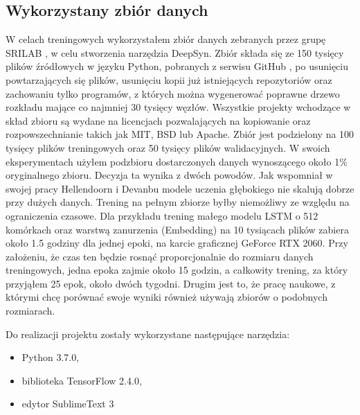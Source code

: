 \subsection {Wykorzystany zbiór danych}
\label{sec:dataset-background}
W celach treningowych wykorzystałem zbiór danych zebranych przez grupę SRILAB \cite{dataset}, w celu stworzenia narzędzia 
DeepSyn. Zbiór składa się ze 150 tysięcy plików źródłowych w języku Python, pobranych z serwisu GitHub \cite{github}, po 
usunięciu powtarzających się plików, usunięciu kopii już istniejących repozytoriów oraz zachowaniu tylko programów, z których
można wygenerować poprawne drzewo rozkładu mające co najmniej 30 tysięcy węzłów. Wszystkie projekty wchodzące w skład 
zbioru są wydane na licencjach pozwalających na kopiowanie oraz rozpowszechnianie takich jak MIT, BSD lub Apache. Zbiór jest 
podzielony na 100 tysięcy plików treningowych oraz 50 tysięcy plików walidacyjnych. W swoich eksperymentach użyłem podzbioru 
dostarczonych danych wynoszącego około 1\% oryginalnego zbioru. Decyzja ta wynika z dwóch powodów. Jak wspomniał w swojej 
pracy Hellendoorn i Devanbu\cite{hellendoorn} modele uczenia głębokiego nie skalują dobrze przy dużych danych. Trening na 
pełnym zbiorze byłby niemożliwy ze względu na ograniczenia czasowe. Dla przykładu trening małego modelu LSTM o 512 komórkach 
oraz warstwą zanurzenia (Embedding) na 10 tysiącach plików zabiera około 1.5 godziny dla jednej epoki, na karcie graficznej GeForce RTX 2060. 
Przy założeniu, że czas ten będzie rosnąć proporcjonalnie do rozmiaru danych treningowych, jedna epoka zajmie 
około 15 godzin, a całkowity trening, za który przyjąłem 25 epok, około dwóch tygodni. Drugim jest to, że pracę naukowe, z 
którymi chcę porównać swoje wyniki również używają zbiorów o podobnych rozmiarach. 

Do realizacji projektu zostały wykorzystane następujące narzędzia:
\begin{itemize}
    \item Python 3.7.0,
    \item biblioteka TensorFlow 2.4.0, 
    \item edytor SublimeText 3
\end{itemize}

